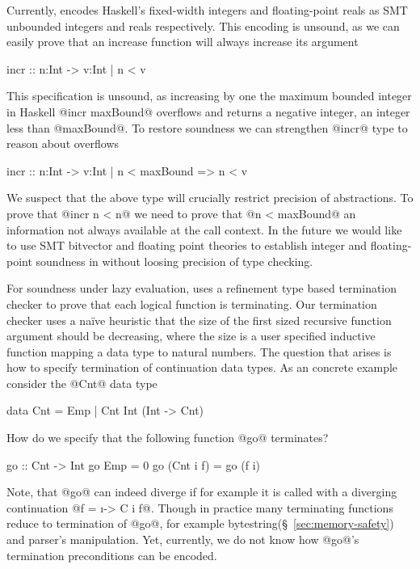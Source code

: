 Currently, \toolname encodes 
Haskell's fixed-width integers 
and floating-point reals as SMT unbounded integers and reals respectively.
This encoding is unsound, as we can easily prove that an increase 
function will always increase its argument
\begin{code}
  incr :: n:Int -> {v:Int | n < v}
\end{code}
This specification is unsound, as increasing by one 
the maximum bounded integer in Haskell
@incr maxBound@
overflows and returns a negative integer, 
\ie an integer less than @maxBound@. 
%
To restore soundness we can strengthen @incr@ type to reason about overflows
\begin{code}
  incr :: n:Int -> {v:Int | n < maxBound => n < v}
\end{code}
We suspect that the above type will crucially restrict precision of abstractions. 
To prove that @incr n < n@ we need to prove that @n < maxBound@ 
an information not always available at the call context. 
%
In the future we would like to 
use SMT bitvector and floating point theories to
establish integer and floating-point 
soundness in \toolname without loosing precision of type checking.  

For soundness under lazy evaluation, 
\toolname uses a refinement type based termination checker 
to prove that each logical function is terminating. 
%
Our termination checker uses a na\"ive heuristic 
that the size of the first sized recursive function argument should be decreasing, 
where the size is a user specified inductive function mapping a data type to natural numbers. 
%
The question that arises is how to specify termination of 
continuation data types.
%
As an concrete example consider the @Cnt@ data type
%
\begin{code}
  data Cnt = Emp | Cnt Int (Int -> Cnt)
\end{code}
How do we specify that the following function @go@ terminates?
\begin{code}
  go :: Cnt -> Int 
  go Emp = 0 
  go (Cnt i f) = go (f i)
\end{code}
Note, that @go@ can indeed diverge if for example it is called with 
a diverging continuation @f = \i -> C i f@.
% 
Though in practice many terminating functions reduce to termination of @go@, 
for example bytestring(\S~\ref{sec:memory-safety}) and parser's manipulation. 
%
Yet, currently, we do not know how @go@'s termination preconditions can be encoded. 

